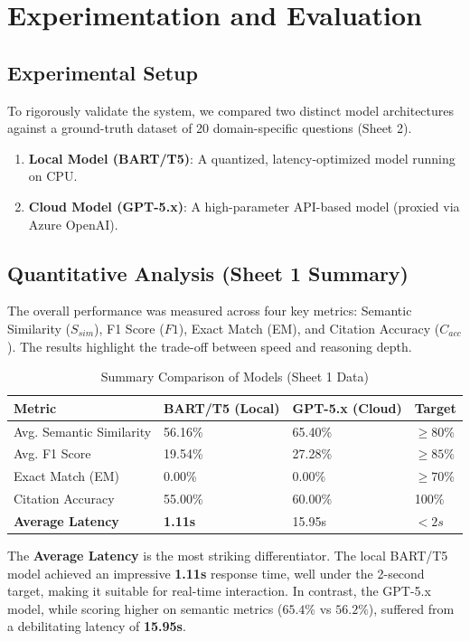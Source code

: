 \documentclass[12pt, a4paper]{article}
\begin{document}
\section{Experimentation and Evaluation}
\subsection{Experimental Setup}
To rigorously validate the system, we compared two distinct model architectures against a ground-truth dataset of 20 domain-specific questions (Sheet 2).
\begin{enumerate}
    \item \textbf{Local Model (BART/T5)}: A quantized, latency-optimized model running on CPU.
    \item \textbf{Cloud Model (GPT-5.x)}: A high-parameter API-based model (proxied via Azure OpenAI).
\end{enumerate}

\subsection{Quantitative Analysis (Sheet 1 Summary)}
The overall performance was measured across four key metrics: Semantic Similarity ($S_{sim}$), F1 Score ($F1$), Exact Match (EM), and Citation Accuracy ($C_{acc}$). The results highlight the trade-off between speed and reasoning depth.

\begin{table}[H]
    \centering
    \begin{tabular}{|l|l|l|l|}
    \hline
    \textbf{Metric} & \textbf{BART/T5 (Local)} & \textbf{GPT-5.x (Cloud)} & \textbf{Target} \\ \hline
    Avg. Semantic Similarity & 56.16\% & 65.40\% & $\ge 80\%$ \\ \hline
    Avg. F1 Score & 19.54\% & 27.28\% & $\ge 85\%$ \\ \hline
    Exact Match (EM) & 0.00\% & 0.00\% & $\ge 70\%$ \\ \hline
    Citation Accuracy & 55.00\% & 60.00\% & 100\% \\ \hline
    \textbf{Average Latency} & \textbf{1.11s} & 15.95s & $< 2s$ \\ \hline
    \end{tabular}
    \caption{Summary Comparison of Models (Sheet 1 Data)}
    \label{tab:summary}
\end{table}

The \textbf{Average Latency} is the most striking differentiator. The local BART/T5 model achieved an impressive \textbf{1.11s} response time, well under the 2-second target, making it suitable for real-time interaction. In contrast, the GPT-5.x model, while scoring higher on semantic metrics ($65.4\%$ vs $56.2\%$), suffered from a debilitating latency of \textbf{15.95s}.
\end{document}

